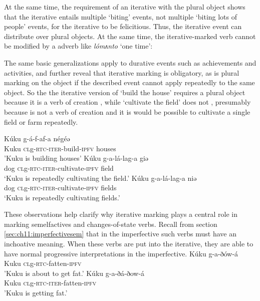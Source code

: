 At the same time, the requirement of an iterative with the plural object shows that the iterative entails multiple `biting' events, not multiple `biting lots of people' events, for the iterative to be felicitious. Thus, the iterative event can distribute over plural objects. At the same time, the iterative-marked verb cannot be modified by a adverb like \textit{lómʌnto} `one time':	

	  \z
	  
The same basic generalizations apply to durative events such as achievements and activities, and further reveal that iterative marking is obligatory, as is plural marking on the object if the described event cannot apply repeatedly to the same object. So the the iterative version of `build the house' requires a plural object because it is a verb of creation , while `cultivate the field' does not , presumably because is not a verb of creation and it is would be possible to cultivate a single field or farm repeatedly.

\ea 
{}
\ex \gll Kúku g-á-f-af-a négéə\\ 
Kuku \textsc{cl}g-\textsc{rtc}-\textsc{iter}-build-\textsc{ipfv} houses\\
\glt 'Kuku is building houses' \label{ex:ch11:iterbuild}
\z
\ea \label{ex:ch11:iterfarm}
\gll  Kúku 	g-a-lá-lag-a giə\\
	  dog \textsc{cl}g-\textsc{rtc}-\textsc{iter}-cultivate-\textsc{ipfv} field\\
\glt `Kuku is repeatedly cultivating the field.'	
\ex 
\gll  Kúku 	g-a-lá-lag-a niə\\
	  dog \textsc{cl}g-\textsc{rtc}-\textsc{iter}-cultivate-\textsc{ipfv} fields\\
\glt `Kuku is repeatedly cultivating fields.'	
\z 
\z 

These observations help clarify why iterative marking plays a central role in marking semelfactives and changes-of-state verbs. Recall from section \ref{sec:ch11:imperfectivesem} that in the imperfective such verbs must have an inchoative meaning. When these verbs are put into the iterative, they are able to have normal progressive interpretations in the imperfective.
\ea 
\ea \gll Kúku g-a-ðów-á\\
		Kuku \textsc{cl}g-\textsc{rtc}-fatten-\textsc{ipfv}\\
	\glt 'Kuku is about to get fat.'
\ex	\gll Kúku g-a-ðá-ðow-á\\
		Kuku \textsc{cl}g-\textsc{rtc}-\textsc{iter}-fatten-\textsc{ipfv}\\
	\glt 'Kuku is getting fat.'
\z
\z

